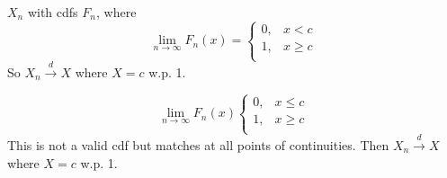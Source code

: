 \documentclass[class=article,crop=false]{standalone}
\begin{document}
\begin{eg}[]
$ X_n$ with cdfs $ F_n$, where
\begin{equation*}
	\lim_{ n \to \infty} F_n(x) =
\begin{cases}
	0,&x<c\\
	1,& x\geq c\\
\end{cases}
\end{equation*}
So $ X_n \xrightarrow{ d} X $ where $ X=c$ w.p. 1.
\end{eg}

\begin{eg}[]
\begin{equation*}
	\lim_{ n \to \infty} F_n(x)
\begin{cases}
	0, &x\leq c\\
	1, & x\geq c\\
\end{cases}
\end{equation*}
This is not a valid cdf but matches at all points of continuities. Then $ X_n \xrightarrow{ d}X $ where $ X=c$ w.p. 1.
\end{eg}
\end{document}
